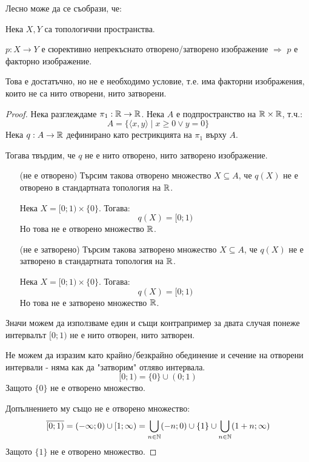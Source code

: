 Лесно може да се съобрази, че:
\begin{proposition}
    Нека $X, Y$ са топологични пространства.

    $p: X \to Y$ е сюрективно непрекъснато отворено/затворено изображение $\Rightarrow$ $p$ е факторно изображение.
\end{proposition}
\begin{remark}
    Това е достатъчно, но не е необходимо условие, т.е. има факторни изображения, които не са нито отворени, нито затворени.
\end{remark}
\begin{proof}
    Нека разглеждаме $\pi_1: {\mathbb{R}} \to {\mathbb{R}}$. Нека $A$ е подпространство на ${\mathbb{R}} \times {\mathbb{R}}$, т.ч.:
    \begin{equation}
        A = \{\langle x, y \rangle \mid x \geq 0 \lor y=0\}
    \end{equation}
    Нека $q : A \to {\mathbb{R}}$ дефинирано като рестрикцията на $\pi_1$ върху $A$.

    Тогава твърдим, че $q$ не е нито отворено, нито затворено изображение.

    \begin{itemize}
        \item[(не е отворено)] Търсим такова отворено множество $X \subseteq A$, че $q(X)$ не е отворено в стандартната топология на ${\mathbb{R}}$.
        
        Нека $X = [0; 1) \times \{0\}$. Тогава:
        \begin{equation}
            q(X) = [0; 1)
        \end{equation}
        Но това не е отворено множество ${\mathbb{R}}$.

        \item[(не е затворено)] Търсим такова затворено множество $X \subseteq A$, че $q(X)$ не е затворено в стандартната топология на ${\mathbb{R}}$.
        
        Нека $X = [0; 1) \times \{0\}$. Тогава:
        \begin{equation}
            q(X) = [0; 1)
        \end{equation}
        Но това не е затворено множество ${\mathbb{R}}$.
    \end{itemize}
    Значи можем да използваме един и същи контрапример за двата случая понеже интервалът $[0; 1)$ не е нито отворен, нито затворен.

    Не можем да изразим като крайно/безкрайно обединение и сечение на отворени интервали - няма как да "затворим" отляво интервала.
    \begin{equation}
        [0; 1) = \{0\} \cup (0; 1)
    \end{equation}
    Защото $\{0\}$ не е отворено множество.

    Допълнението му също не е отворено множество:
    \begin{equation}
        \overline{[0; 1)} = (-\infty; 0) \cup [1; \infty) = \bigcup_{n \in {\mathbb{N}}} (-n;0) \cup \{1\} \cup \bigcup_{n\in{\mathbb{N}}} (1+n;\infty)
    \end{equation}
    Защото $\{1\}$ не е отворено множество.
\end{proof}

